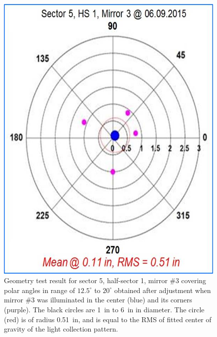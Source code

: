 \begin{figure}[ht]
    \centering
    \includegraphics[width=1.0\linewidth,trim={0 0cm 0 0},clip]{images/Ch_5_1_3_After_NEW.jpg}
    \caption{Geometry test result for sector 5, half-sector 1, mirror \#3 covering polar angles in range of
      $12.5^\circ$ to $20^\circ$ obtained after adjustment when mirror \#3 was illuminated in the center (blue) and
      its corners (purple). The black circles are 1~in to 6~in in diameter. The circle (red) is of radius 0.51~in, and is
      equal to the RMS of fitted center of gravity  of the light collection pattern.}
    \label{fig:Ch_5_1_3_After_NEW}
\end{figure}

